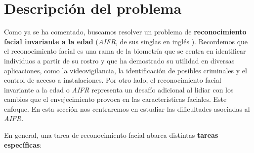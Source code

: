 \section{Descripción del problema} \label{ich:descrp_problema}

Como ya se ha comentado, buscamos resolver un problema de \textbf{reconocimiento facial invariante a la edad} (\textit{AIFR}, de sus singlas en inglés ). Recordemos que el reconocimiento facial es una rama de la biometría que se centra en identificar individuos a partir de su rostro y que ha demostrado su utilidad en diversas aplicaciones, como la videovigilancia, la identificación de posibles criminales y el control de acceso a instalaciones. Por otro lado, el reconocimiento facial invariante a la edad o \textit{AIFR} representa un desafío adicional al lidiar con los cambios que el envejecimiento provoca en las características faciales. Este enfoque. En esta sección nos centraremos en estudiar las dificultades asociadas al \textit{AIFR}.

En general, una tarea de reconocimiento facial abarca distintas \textbf{tareas específicas}:

